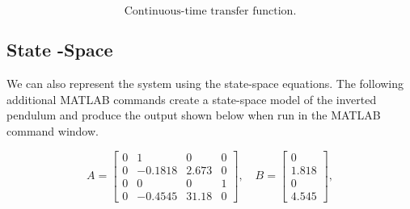 \documentclass[12pt]{article}
\begin{document}
\[
\text{Continuous-time transfer function.}
\]

\subsection{State -Space}
We can also represent the system using the state-space equations. The following additional MATLAB commands create a state-space model of the inverted pendulum and produce the output shown below when run in the MATLAB command window. 









\begin{equation}
A = 
\begin{bmatrix}
0      & 1       & 0     & 0 \\
0      & -0.1818 & 2.673 & 0 \\
0      & 0       & 0     & 1 \\
0      & -0.4545 & 31.18 & 0
\end{bmatrix}, \quad
B =
\begin{bmatrix}
0 \\ 1.818 \\ 0 \\ 4.545
\end{bmatrix},
\end{equation}
\end{document}
